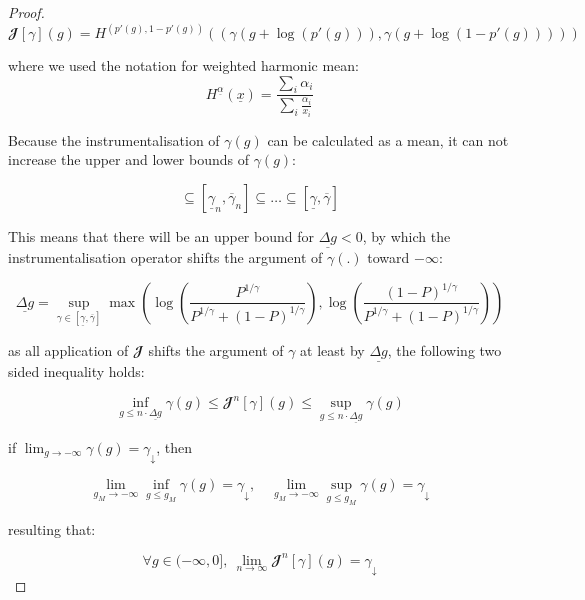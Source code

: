 \documentclass{article}
\theoremstyle{definition}
\begin{document}
\begin{proof}
    \begin{equation}
        \mathbfcal{J}[\gamma](g) = H^{(p'(g),1-p'(g))} ((\gamma(g+ \log(p'(g))), \gamma(g+ \log(1-p'(g)))))
    \end{equation}

    where we used the notation for weighted harmonic mean:
    \begin{equation}
        H^{\underline{\alpha}}(\underline{x}) = \frac{\sum_i \alpha_i}{\sum_i \frac{\alpha_i}{x_i}} 
    \end{equation}

    Because the instrumentalisation of $\gamma(g)$ can be calculated as a mean, it can not increase the upper and lower bounds of $\gamma(g)$:

    \begin{equation}
        [\underline{\gamma}_{n+1},\overline{\gamma}_{n+1}] \subseteq [\underline{\gamma}_{n},\overline{\gamma}_{n}] \subseteq \dots \subseteq [\underline{\gamma}, \overline{\gamma}]
    \end{equation}

    This means that there will be an upper bound for $\underline{\Delta g} < 0$, by which the instrumentalisation operator shifts the argument of $\gamma(.)$ toward $-\infty$:

    \begin{equation}
        \underline{\Delta g} = \sup_{\gamma \in [\underline{\gamma}, \overline{\gamma}]} \max
        \left ( \log \left ( \frac{P^{1/\gamma}}{P^{1/\gamma}+(1-P)^{1/\gamma}} \right )  , 
        \log \left ( \frac{(1-P)^{1/\gamma}}{P^{1/\gamma}+(1-P)^{1/\gamma}} \right ) \right )
    \end{equation}
    
    as all application of $\mathbfcal{J}$ shifts the argument of $\gamma$ at least by $\underline{\Delta g}$, the following two sided inequality holds:

    \begin{equation}
        \inf_{g \le n \cdot \underline{\Delta g}}{\gamma(g)} \le 
        \mathbfcal{J}^n[\gamma](g)
        \le \sup_{g \le n \cdot \underline{\Delta g}}{\gamma(g)}
    \end{equation}

    if $\lim_{g \to -\infty} \gamma(g) = \gamma_\downarrow$, then

    \begin{equation}
        \lim_{g_M \to -\infty} \inf_{g \le g_M}{\gamma(g)} = \gamma_\downarrow, \quad
        \lim_{g_M \to -\infty} \sup_{g \le g_M}{\gamma(g)} = \gamma_\downarrow
    \end{equation}

    resulting that:

    \begin{equation}
        \forall g \in (-\infty,0], \  \lim_{n \to \infty}  \mathbfcal{J}^n[\gamma](g) = \gamma_\downarrow
    \end{equation}
    
\end{proof}
\end{document}
